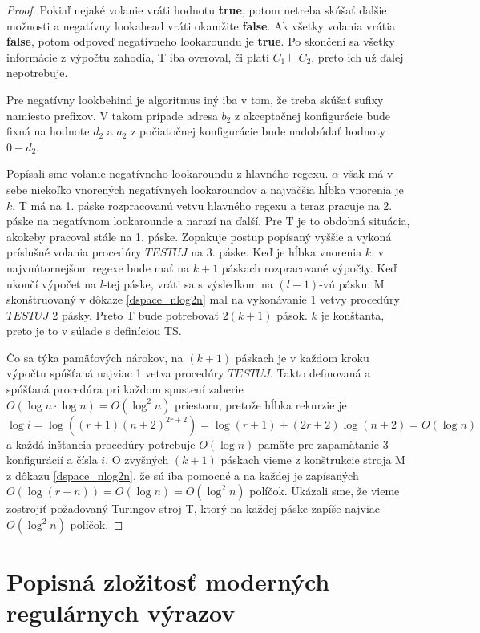 \begin{proof}
Pokiaľ nejaké volanie vráti hodnotu \textbf{true}, potom netreba skúšať ďalšie možnosti a negatívny lookahead vráti okamžite \textbf{false}. Ak všetky volania vrátia \textbf{false}, potom odpoveď negatívneho lookaroundu je \textbf{true}. Po skončení sa všetky informácie z výpočtu zahodia, T iba overoval, či platí $C_1\vdash C_2$, preto ich už ďalej nepotrebuje.

Pre negatívny lookbehind je algoritmus iný iba v tom, že treba skúšať sufixy namiesto prefixov. V takom prípade adresa $b_2$ z akceptačnej konfigurácie bude fixná na hodnote $d_2$ a $a_2$ z počiatočnej konfigurácie bude nadobúdať hodnoty $0-d_2$.

Popísali sme volanie negatívneho lookaroundu z hlavného regexu. $\alpha$ však má v sebe niekoľko vnorených negatívnych lookaroundov a najväčšia hĺbka vnorenia je $k$. T má na 1. páske rozpracovanú vetvu hlavného regexu a teraz pracuje na 2. páske na negatívnom lookarounde a narazí na ďalší. Pre T je to obdobná situácia, akokeby pracoval stále na 1. páske. Zopakuje postup popísaný vyššie a vykoná príslušné volania procedúry $TESTUJ$ na 3. páske. Keď je hĺbka vnorenia $k$, v najvnútornejšom regexe bude mať na $k+1$ páskach rozpracované výpočty. Keď ukončí výpočet na $l$-tej páske, vráti sa s výsledkom na $(l-1)$-vú pásku. M skonštruovaný v dôkaze \ref{dspace_nlog2n} mal na vykonávanie 1 vetvy procedúry $TESTUJ$ 2 pásky. Preto T bude potrebovať $2(k+1)$ pások. $k$ je konštanta, preto je to v súlade s definíciou TS.

Čo sa týka pamäťových nárokov, na $(k+1)$ páskach je v každom kroku výpočtu spúšťaná najviac 1 vetva procedúry $TESTUJ$. Takto definovaná a spúšťaná procedúra pri každom spustení zaberie $O(\log n\cdot\log n) = O(\log ^2 n)$ priestoru, pretože hĺbka rekurzie je $$\log i = \log ((r+1)(n+2)^{2r+2}) = \log (r+1) + (2r+2)\log (n+2) = O(\log n)$$ a každá inštancia procedúry potrebuje $O(\log n)$ pamäte pre zapamätanie 3 konfigurácií a čísla $i$. O zvyšných $(k+1)$ páskach vieme z konštrukcie stroja M z dôkazu \ref{dspace_nlog2n}, že sú iba pomocné a na každej je zapísaných $O(\log (r+n)) = O(\log n) = O(\log^2 n)$ políčok. Ukázali sme, že vieme zostrojiť požadovaný Turingov stroj T, ktorý na každej páske zapíše najviac $O(\log^2 n)$ políčok.
\end{proof}

\section[Popisná zložitosť]{Popisná zložitosť moderných regulárnych výrazov}
\label{vzlozitost}

